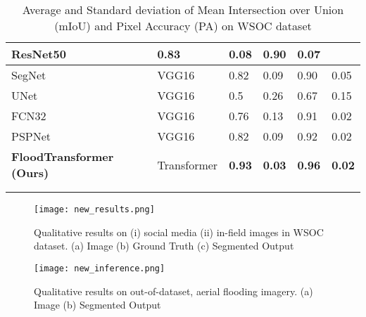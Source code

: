 \documentclass{article}
\begin{document}
\begin{table*}[]
\begin{tabular}{llllll}
  \multicolumn{1}{l|}{ResNet50} &
  \multicolumn{1}{l|}{0.83} &
  \multicolumn{1}{l|}{0.08} &
  \multicolumn{1}{l|}{0.90} &
  \multicolumn{1}{l|}{0.07} \\ \hline
\multicolumn{1}{|l|}{SegNet \cite{segnet}} &
  \multicolumn{1}{l|}{VGG16} &
  \multicolumn{1}{l|}{0.82} &
  \multicolumn{1}{l|}{0.09} &
  \multicolumn{1}{l|}{0.90} &
  \multicolumn{1}{l|}{0.05} \\ \hline
\multicolumn{1}{|l|}{UNet \cite{unet}} &
  \multicolumn{1}{l|}{VGG16} &
  \multicolumn{1}{l|}{0.5} &
  \multicolumn{1}{l|}{0.26} &
  \multicolumn{1}{l|}{0.67} &
  \multicolumn{1}{l|}{0.15} \\ \hline
\multicolumn{1}{|l|}{FCN32 \cite{fcn32}} &
  \multicolumn{1}{l|}{VGG16} &
  \multicolumn{1}{l|}{0.76} &
  \multicolumn{1}{l|}{0.13} &
  \multicolumn{1}{l|}{0.91} &
  \multicolumn{1}{l|}{0.02} \\ \hline
\multicolumn{1}{|l|}{PSPNet \cite{pspnet}} &
  \multicolumn{1}{l|}{VGG16} &
  \multicolumn{1}{l|}{0.82} &
  \multicolumn{1}{l|}{0.09} &
  \multicolumn{1}{l|}{0.92} &
  \multicolumn{1}{l|}{0.02} \\ \hline
\multicolumn{1}{|l|}{\textbf{FloodTransformer (Ours)}} &
  \multicolumn{1}{l|}{Transformer} &
  \multicolumn{1}{l|}{\textbf{0.93}} &
  \multicolumn{1}{l|}{\textbf{0.03}} &
  \multicolumn{1}{l|}{\textbf{0.96}} &
  \multicolumn{1}{l|}{\textbf{0.02}} \\ \hline
 &
   &
   &
   &
   &
   \\
 &
   &
   &
   &
   &
   \\

  
\end{tabular}
\vspace{-20pt}
\caption{\centering Average and Standard deviation of Mean Intersection over Union
(mIoU) and Pixel Accuracy (PA) on WSOC dataset}
\label{tab:my-table-1}
\end{table*}

\begin{figure}[ht]
    \centering

    {{\texttt{[image: new\_results.png]}}}\enskip
    \caption{\centering Qualitative results on (i) social media (ii) in-field images in WSOC dataset. \newline \centering (a) Image (b) Ground Truth (c) Segmented Output}\label{fig:WSOC}\end{figure}

\begin{figure}[ht]
    \centering

    {{\texttt{[image: new\_inference.png]}}}\enskip
    \caption{\centering Qualitative results on out-of-dataset, aerial flooding imagery. \newline \centering (a) Image (b) Segmented Output}\label{fig:Unlabelled}\end{figure}
\end{document}
